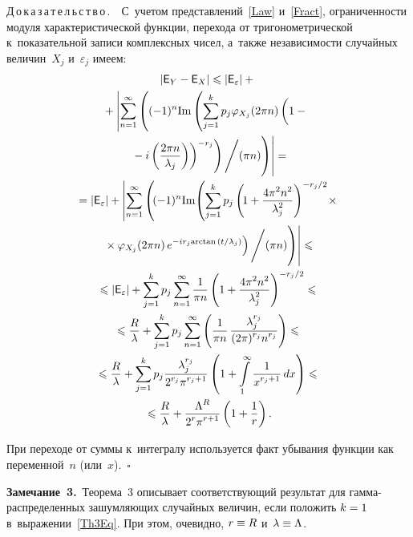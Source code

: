 \begin{multicols}{2}
\noindent
Д\,о\,к\,а\,з\,а\,т\,е\,л\,ь\,с\,т\,в\,о\,.\ \
С~учетом пред\-став\-ле\-ний~\eqref{Law} и~\eqref{Fract}, ограниченности 
модуля характеристической функции, перехода от тригонометрической к~показательной 
записи комплексных чисел, а~также независимости случайных величин~$X_j$ 
и~$\varepsilon_j$ \mbox{имеем}:
\begin{multline*}
\left\lvert {\sf E}_Y-{\sf E}_X\right\rvert
\leqslant \left\lvert {\sf E}_\varepsilon\right\rvert+ {}\\
{}+\left\lvert\sum\limits_{n=1}^\infty
\left(
(-1)^n\mathrm{Im} \left(\sum\limits_{j=1}^{k}p_j \varphi_{X_j}(2\pi n)\left(
\vphantom{\fr{2\pi n}{\lambda_j}}
1-{}\right.\right.\right.\right.\\
\left.\left.\left.\left.{}-i\left(\fr{2\pi n}{\lambda_j}\right)\right)^{-r_j}\right)
\Bigg/ ({\pi n})
\vphantom{\sum\limits_{j=1}^{k}}
\right)\right\rvert={}\\
{}=\left\lvert {\sf E}_\varepsilon\right\rvert+ 
\left\lvert\sum\limits_{n=1}^\infty
\left(\!(-1)^n\mathrm{Im} \!\left(\sum\limits_{j=1}^{k}p_j \left(\!
1+\fr{4\pi^2 n^2}{\lambda_j^2}\right)^{- {r_j}/2}\!\times{}\right.\right.\right.\hspace*{-2.8663pt}\\
\left.\left.\left.{}\times \varphi_{X_j}(2\pi n)\,
e^{-ir_j\mathrm{arctan}\,({{t}/{\lambda_j}})}\right)
\Bigg/
({\pi n})
\vphantom{\left(
1+\fr{4\pi^2 n^2}{\lambda_j^2}\right)^{- {r_j}/2}}
\right)\right\rvert\leqslant{}\\
{}\leqslant \left\lvert {\sf E}_\varepsilon\right\rvert+\sum\limits_{j=1}^{k}
p_j\sum\limits_{n=1}^\infty\fr{1}{\pi n}\left(
1+\fr{4\pi^2 n^2}{\lambda_j^2}\right)^{-{r_j}/2}\leqslant{}\\
{}\leqslant  \fr{R}\lambda + \sum\limits_{j=1}^{k}p_j
\sum\limits_{n=1}^\infty\left(\fr{1}{\pi n}\,
\fr{\lambda_j^{r_j}}{(2\pi)^{r_j} n^{r_j}}\right)\leqslant {}
\\
{}\leqslant  \fr{R}{\lambda} + \sum\limits_{j=1}^{k}p_j 
\fr{\lambda_j^{r_j}}{2^{r_j}\pi^{r_j+1}}\left(1+\int\limits_{1}^{\infty}
\fr{1}{ x^{r_j+1}}\,dx\right)
\leqslant{}\\
{}\leqslant \fr{R}{\lambda}+\fr{\Lambda^{R}}{2^{r}\pi^{r+1}}\left(1+\fr{1}{r}\right).
\end{multline*}

При переходе от суммы к~интегралу используется факт убывания функции как переменной~$n$ 
(или~$x$).~\hfill$\square$


\smallskip

\noindent
\textbf{Замечание~3.}\
Теорема~3 описывает соответ\-ст\-ву\-ющий результат для гам\-ма-рас\-пре\-де\-лен\-ных 
за\-шум\-ля\-ющих случайных величин, если положить $k\hm=1$ в~выражении~\eqref{Th3Eq}. 
При этом, очевидно, $r\hm\equiv R$ и~$\lambda\hm\equiv \Lambda$.



\end{multicols}
